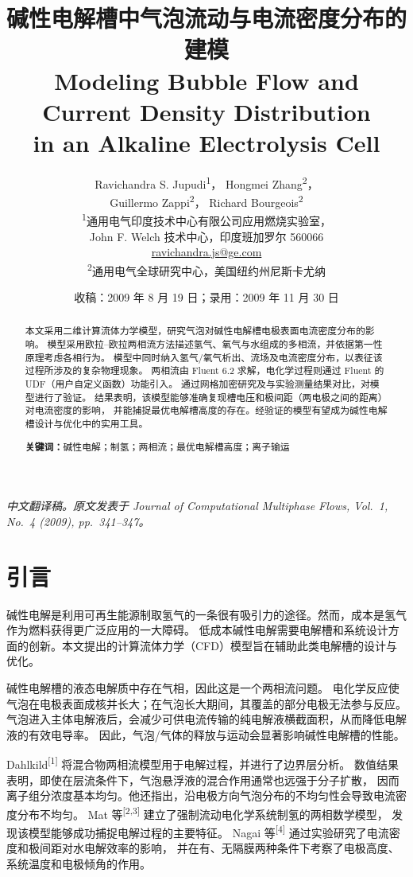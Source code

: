 \documentclass[UTF8,zihao=-4,fontset=fandol]{ctexart}
\title{\bfseries 碱性电解槽中气泡流动与电流密度分布的建模\\
\large Modeling Bubble Flow and Current Density Distribution\\
in an Alkaline Electrolysis Cell}
\author{
Ravichandra S. Jupudi\textsuperscript{1}，
Hongmei Zhang\textsuperscript{2}，\\
Guillermo Zappi\textsuperscript{2}，
Richard Bourgeois\textsuperscript{2}\\[0.8em]
\small\textsuperscript{1}通用电气印度技术中心有限公司应用燃烧实验室，\\[-0.2em]
\small John F. Welch 技术中心，印度班加罗尔 560066\\
\small \href{mailto:ravichandra.js@ge.com}{ravichandra.js@ge.com}\\[0.35em]
\small\textsuperscript{2}通用电气全球研究中心，美国纽约州尼斯卡尤纳
}
\date{\small 收稿：2009 年 8 月 19 日；录用：2009 年 11 月 30 日}
\begin{document}
\maketitle
\thispagestyle{empty}

\begin{center}
\small\itshape
中文翻译稿。原文发表于 \emph{Journal of Computational Multiphase Flows},
Vol.~1, No.~4 (2009), pp.~341--347。
\end{center}

\begin{abstract}
本文采用二维计算流体力学模型，研究气泡对碱性电解槽电极表面电流密度分布的影响。
模型采用欧拉--欧拉两相流方法描述氢气、氧气与水组成的多相流，并依据第一性原理考虑各相行为。
模型中同时纳入氢气/氧气析出、流场及电流密度分布，以表征该过程所涉及的复杂物理现象。
两相流由 Fluent 6.2 求解，电化学过程则通过 Fluent 的 UDF（用户自定义函数）功能引入。
通过网格加密研究及与实验测量结果对比，对模型进行了验证。
结果表明，该模型能够准确复现槽电压和极间距（两电极之间的距离）对电流密度的影响，
并能捕捉最优电解槽高度的存在。经验证的模型有望成为碱性电解槽设计与优化中的实用工具。

\noindent\textbf{关键词：}碱性电解；制氢；两相流；最优电解槽高度；离子输运
\end{abstract}

\section{引言}

碱性电解是利用可再生能源制取氢气的一条很有吸引力的途径。然而，成本是氢气作为燃料获得更广泛应用的一大障碍。
低成本碱性电解需要电解槽和系统设计方面的创新。本文提出的计算流体力学（CFD）模型旨在辅助此类电解槽的设计与优化。

碱性电解槽的液态电解质中存在气相，因此这是一个两相流问题。
电化学反应使气泡在电极表面成核并长大；在气泡长大期间，其覆盖的部分电极无法参与反应。
气泡进入主体电解液后，会减少可供电流传输的纯电解液横截面积，从而降低电解液的有效电导率。
因此，气泡/气体的释放与运动会显著影响碱性电解槽的性能。

Dahlkild\textsuperscript{[1]} 将混合物两相流模型用于电解过程，并进行了边界层分析。
数值结果表明，即使在层流条件下，气泡悬浮液的混合作用通常也远强于分子扩散，
因而离子组分浓度基本均匀。他还指出，沿电极方向气泡分布的不均匀性会导致电流密度分布不均匀。
Mat 等\textsuperscript{[2,3]} 建立了强制流动电化学系统制氢的两相数学模型，
发现该模型能够成功捕捉电解过程的主要特征。
Nagai 等\textsuperscript{[4]} 通过实验研究了电流密度和极间距对水电解效率的影响，
并在有、无隔膜两种条件下考察了电极高度、系统温度和电极倾角的作用。
\end{document}
